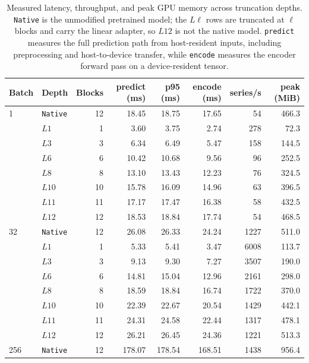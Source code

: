 \begin{table}[t]
    \centering
    \small
    \caption{
    Measured latency, throughput, and peak GPU memory across truncation depths.
    \texttt{Native} is the unmodified pretrained model; the \(L\ell\) rows are truncated at \(\ell\) blocks and carry the linear adapter, so \(L12\) is not the native model.
    \texttt{predict} measures the full prediction path from host-resident inputs, including preprocessing and host-to-device transfer, while \texttt{encode} measures the encoder forward pass on a device-resident tensor.
    }
    \label{tab:latency-full}
    \begin{tabular}{llrrrrrr}
        \toprule
        Batch & Depth & Blocks & predict (ms) & p95 (ms) & encode (ms) & series/s & peak (MiB) \\
        \midrule
        1 & \texttt{Native} & 12 & 18.45 & 18.75 & 17.65 & 54 & 466.3 \\
         & \(L1\) & 1 & 3.60 & 3.75 & 2.74 & 278 & 72.3 \\
         & \(L3\) & 3 & 6.34 & 6.49 & 5.47 & 158 & 144.5 \\
         & \(L6\) & 6 & 10.42 & 10.68 & 9.56 & 96 & 252.5 \\
         & \(L8\) & 8 & 13.10 & 13.43 & 12.23 & 76 & 324.5 \\
         & \(L10\) & 10 & 15.78 & 16.09 & 14.96 & 63 & 396.5 \\
         & \(L11\) & 11 & 17.17 & 17.47 & 16.38 & 58 & 432.5 \\
         & \(L12\) & 12 & 18.53 & 18.84 & 17.74 & 54 & 468.5 \\
        \midrule
        32 & \texttt{Native} & 12 & 26.08 & 26.33 & 24.24 & 1227 & 511.0 \\
         & \(L1\) & 1 & 5.33 & 5.41 & 3.47 & 6008 & 113.7 \\
         & \(L3\) & 3 & 9.13 & 9.30 & 7.27 & 3507 & 190.0 \\
         & \(L6\) & 6 & 14.81 & 15.04 & 12.96 & 2161 & 298.0 \\
         & \(L8\) & 8 & 18.59 & 18.84 & 16.74 & 1722 & 370.0 \\
         & \(L10\) & 10 & 22.39 & 22.67 & 20.54 & 1429 & 442.1 \\
         & \(L11\) & 11 & 24.31 & 24.58 & 22.44 & 1317 & 478.1 \\
         & \(L12\) & 12 & 26.21 & 26.45 & 24.36 & 1221 & 513.3 \\
        \midrule
        256 & \texttt{Native} & 12 & 178.07 & 178.54 & 168.51 & 1438 & 956.4 \\

\end{tabular}
\end{table}
